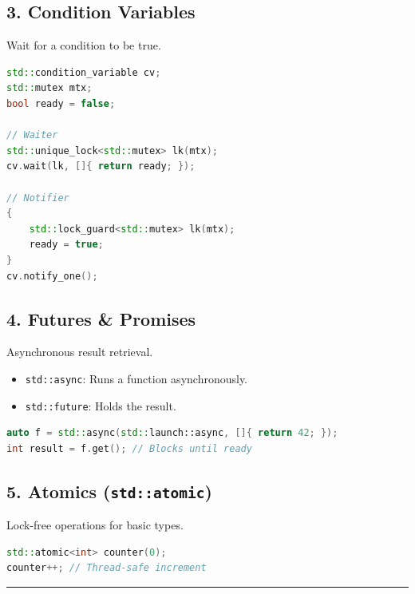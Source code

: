 \hypertarget{condition-variables}{%
\subsection{3. Condition Variables}\label{condition-variables}}

Wait for a condition to be true.

\begin{lstlisting}[language={C++}]
std::condition_variable cv;
std::mutex mtx;
bool ready = false;

// Waiter
std::unique_lock<std::mutex> lk(mtx);
cv.wait(lk, []{ return ready; });

// Notifier
{
    std::lock_guard<std::mutex> lk(mtx);
    ready = true;
}
cv.notify_one();
\end{lstlisting}

\hypertarget{futures-promises}{%
\subsection{4. Futures \& Promises}\label{futures-promises}}

Asynchronous result retrieval.

\begin{itemize}
\tightlist
\item
  \passthrough{\lstinline!std::async!}: Runs a function asynchronously.
\item
  \passthrough{\lstinline!std::future!}: Holds the result.
\end{itemize}

\begin{lstlisting}[language={C++}]
auto f = std::async(std::launch::async, []{ return 42; });
int result = f.get(); // Blocks until ready
\end{lstlisting}

\hypertarget{atomics-stdatomic}{%
\subsection{\texorpdfstring{5. Atomics
(\texttt{std::atomic})}{5. Atomics (std::atomic)}}\label{atomics-stdatomic}}

Lock-free operations for basic types.

\begin{lstlisting}[language={C++}]
std::atomic<int> counter(0);
counter++; // Thread-safe increment
\end{lstlisting}

\begin{center}\rule{0.5\linewidth}{0.5pt}\end{center}

